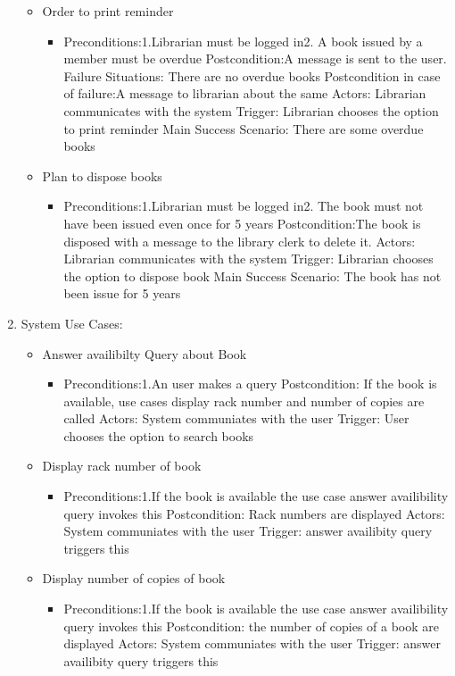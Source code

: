 \documentclass{article}
\begin{document}
\begin{enumerate}
\begin{itemize}
 \item Order to print reminder
 \begin{itemize}
  \item Preconditions:1.Librarian must be logged in2. A book issued by a member must be overdue
 Postcondition:A message is sent to the user.
 Failure Situations: There are no overdue books
 Postcondition in case of failure:A message to librarian about the same
 Actors: Librarian communicates with the system
 Trigger: Librarian  chooses the option to print reminder
 Main Success Scenario: There are some overdue books
 \end{itemize}

\item Plan to dispose books
 \begin{itemize}
  \item Preconditions:1.Librarian must be logged in2. The book must not have been issued even once for 5 years
 Postcondition:The book is disposed with a message to the library clerk to delete it.
 Actors: Librarian communicates with the system
 Trigger: Librarian  chooses the option to dispose book
 Main Success Scenario: The book has not been issue for 5 years
 \end{itemize}
 

\end{itemize}

\item System Use Cases:
 \begin{itemize}
 
  \item Answer availibilty Query about Book
	\begin{itemize}
	\item  Preconditions:1.An user makes a query
 Postcondition: If the book is available, use cases display rack number and number of copies are called
 Actors: System communiates with the user
 Trigger: User chooses the option to search books
	\end{itemize}

\item Display rack number of book
	\begin{itemize}
	\item  Preconditions:1.If the book is available the use case answer availibility query invokes this
 Postcondition: Rack numbers are displayed
 Actors: System communiates with the user
 Trigger: answer availibity query triggers this
	\end{itemize}
 
 \item Display number of copies of book
	\begin{itemize}
	\item  Preconditions:1.If the book is available the use case answer availibility query invokes this
 Postcondition: the number of copies of a book are displayed
 Actors: System communiates with the user
 Trigger: answer availibity query triggers this
	\end{itemize}


\end{itemize}
\end{enumerate}
\end{document}
